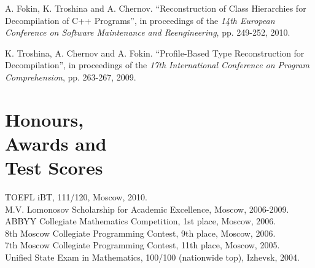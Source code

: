 \documentclass[margin,line]{CV}
\begin{document}
\begin{resume}
    A. Fokin, K. Troshina and A. Chernov. ``Reconstruction of Class Hierarchies for Decompilation of C++ Programs'',
    in proceedings of the \textsl{14th European Conference on Software Maintenance and Reengineering}, pp. 249-252, 2010.

    K. Troshina, A. Chernov and A. Fokin. ``Profile-Based Type Reconstruction for Decompilation'',
    in proceedings of the \textsl{17th International Conference on Program Comprehension}, pp. 263-267, 2009.


    \section{\mysidestyle Honours, \\Awards and \\Test Scores}
    TOEFL iBT, 111/120, Moscow, 2010.                                                               \vspace{1mm}\\
    M.V. Lomonosov Scholarship for Academic Excellence, Moscow, 2006-2009.                          \vspace{1mm}\\
    ABBYY Collegiate Mathematics Competition, 1st place, Moscow, 2006.                              \vspace{1mm}\\
    8th Moscow Collegiate Programming Contest, 9th place, Moscow, 2006.                             \vspace{1mm}\\
    7th Moscow Collegiate Programming Contest, 11th place, Moscow, 2005.                            \vspace{1mm}\\
    Unified State Exam in Mathematics, 100/100 (nationwide top), Izhevsk, 2004.                     \vspace{1mm}



\end{resume}
\end{document}
